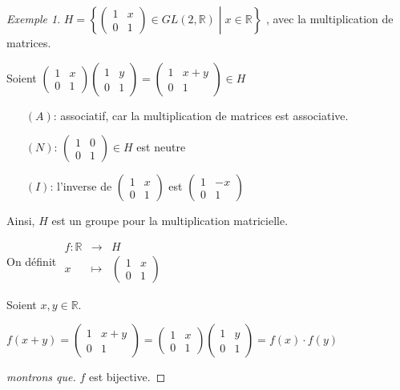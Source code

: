 \documentclass{report}
\newcommand*{\reels}{\mathbb{R}}
\theoremstyle{definition}
\theoremstyle{remark}
\newtheorem*{exem}{Exemple}
\begin{document}
	\begin{exem}
		\(
		H= \left\lbrace \begin{pmatrix}
			1&x\\0&1
		\end{pmatrix} \in GL(2, \reels) \middle| x \in \reels \right\rbrace
		\)
		, avec la multiplication de matrices.

		Soient $\begin{pmatrix}
			1&x\\0&1
		\end{pmatrix} \begin{pmatrix}
			1&y\\0&1
		\end{pmatrix} = \begin{pmatrix}
			1&x+y\\0&1
		\end{pmatrix} \in H$
		\begin{itemize}
			\item[$(A)$:] associatif, car la multiplication de matrices est associative.
			\item[$(N)$:] $\begin{pmatrix}
				1&0\\0&1
			\end{pmatrix} \in H$ est neutre
			\item[$(I)$:] l'inverse de $\begin{pmatrix}
				1&x\\0&1
			\end{pmatrix}$ est $\begin{pmatrix}
				1&-x\\0&1
			\end{pmatrix}$
		\end{itemize}
		Ainsi, $H$ est un groupe pour la multiplication matricielle.

		On d\'efinit
		$\begin{array}{rcl}
			f:\reels &\to& H\\
			x&\mapsto&\begin{pmatrix}
				1&x\\0&1
			\end{pmatrix}
		\end{array}$

		Soient $x,y \in \reels$.
		\begin{nlist}
			\item $f(x+y) = \begin{pmatrix}
				1&x+y\\0&1
			\end{pmatrix} = \begin{pmatrix}
			1&x\\0&1
			\end{pmatrix} \begin{pmatrix}
			1&y\\0&1
			\end{pmatrix} = f(x) \cdot f(y)$
			\item
			\begin{proof}[montrons que]
				$f$ est bijective.


\end{proof}
\end{nlist}
\end{exem}
\end{document}
